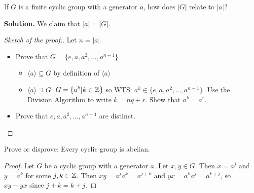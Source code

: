 \begin{example}
If $G$ is a finite cyclic group with a generator $a$, how does $|G|$ relate to $|a|$?
\end{example}
\textbf{Solution.} We claim that $|a|=|G|$.
\begin{proof}[Sketch of the proof:]
Let $n=|a|$. 
\begin{itemize}
    \item Prove that $G=\{e,a,a^2,\dots,a^{n-1}\}$
    \begin{itemize}
        \item $\langle a \rangle \subseteq G$ by definition of $\langle a \rangle$
        \item $\langle a \rangle \supseteq G$: $G= \{a^k|k\in \mathbb{Z}\}$ so WTS: $a^k\in \{e,a,a^2,\dots,a^{n-1}\}$. Use the Division Algorithm to write $k=nq+r$. Show that $a^k=a^r$.
    \end{itemize}
    \item Prove that $e,a,a^2,\dots,a^{n-1}$ are distinct.
\end{itemize}
\end{proof}

\begin{example}
Prove or disprove: Every cyclic group is abelian.
\end{example}
\begin{proof}
Let $G$ be a cyclic group with a generator $a$. Let $x,y\in G$. Then $x =a^j$ and $y=a^k$ for some $j,k\in \mathbb{Z}$. Then $xy=a^ja^k=a^{j+k}$ and $yx=a^ka^j=a^{k+j}$, so $xy-yx$ since $j+k=k+j$.
\end{proof}